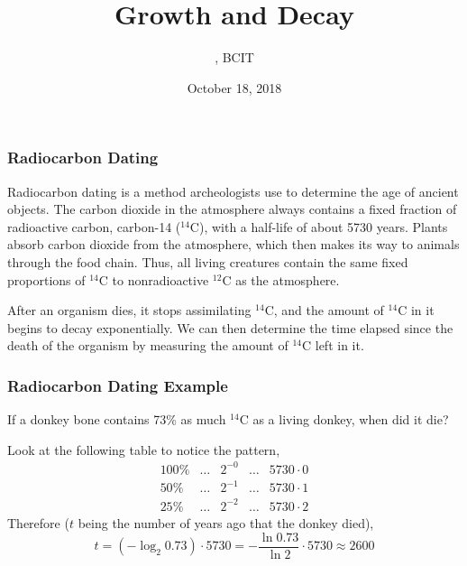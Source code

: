 \documentclass[xcolor=dvipsnames]{beamer}
\title{Growth and Decay}
\subtitle{{\CourseNumber}, BCIT}
\author{\CourseName}
\date{October 18, 2018}
\begin{document}
\begin{frame}
  \titlepage
\end{frame}

\begin{frame}
  \frametitle{Radiocarbon Dating}
Radiocarbon dating is a method archeologists use to determine the age
of ancient objects. The carbon dioxide in the atmosphere always
contains a fixed fraction of radioactive carbon, carbon-14 ($^{14}$C),
with a half-life of about 5730 years. Plants absorb carbon dioxide
from the atmosphere, which then makes its way to animals through the
food chain. Thus, all living creatures contain the same fixed
proportions of $^{14}$C to nonradioactive $^{12}$C as the atmosphere.

\medskip

After an organism dies, it stops assimilating $^{14}$C, and the amount
of $^{14}$C in it begins to decay exponentially. We can then determine
the time elapsed since the death of the organism by measuring the
amount of $^{14}$C left in it.
\end{frame}

\begin{frame}
  \frametitle{Radiocarbon Dating Example}
If a donkey bone contains 73\% as much $^{14}$C as a living donkey,
when did it die?

\medskip

Look at the following table to notice the pattern,
\begin{equation}
  \label{eq:sayeeziu}
  \begin{array}{rcccl}
        100\% & \ldots & 2^{-0} & \ldots & 5730\cdot{}0 \\
        50\% & \ldots & 2^{-1} & \ldots & 5730\cdot{}1 \\
        25\% & \ldots & 2^{-2} & \ldots & 5730\cdot{}2
  \end{array}
\end{equation}
Therefore ($t$ being the number of years ago that the donkey died),
\begin{equation}
  \label{eq:anuvuama}
  t=\left(-\log_{2}0.73\right)\cdot{}5730=-\frac{\ln{}0.73}{\ln{}2}\cdot{}5730\approx{}2600
\end{equation}
\end{frame}
\end{document}
